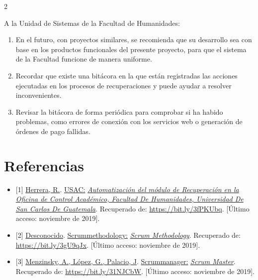 \documentclass[12pt,spanish,Letterpaper,openany]{book}
\providecommand{\tightlist}{%
  \setlength{\itemsep}{0pt}\setlength{\parskip}{0pt}}
\newcommand{\spaceoneminus}{\vspace{-1mm}}
\newcommand{\spacetwominus}{\vspace{-2mm}}
\newcommand{\spacefourminus}{\vspace{-4mm}}
\begin{document}
\begin {multicols}{2}
\spacetwominus
\spaceoneminus

A la Unidad de Sistemas de la Facultad de Humanidades:

\begin{enumerate}
\def\labelenumi{\arabic{enumi}.}
\item
  En el futuro, con proyectos similares, se recomienda que su desarrollo sea con base en los productos funcionales del presente proyecto, para que el sistema de la Facultad funcione de manera uniforme.
\item
  Recordar que existe una bitácora en la que están registradas las acciones ejecutadas en los procesos de recuperaciones y puede ayudar a resolver inconvenientes.
\item
  Revisar la bitácora de forma periódica para comprobar si ha habido problemas, como errores de conexión con los servicios web o generación de órdenes de pago fallidas.
\end{enumerate}

\spacefourminus

\hypertarget{referencias-2}{%
\section{Referencias}\label{referencias-2}}

\spacetwominus
\spaceoneminus

\begin{itemize}
\item
  {[}1{]} \href{http://www.repositorio.usac.edu.gt/8239/1/Rodrigo\%20Antonio\%20Herrera\%20De\%20Le\%C3\%B3n.pdf}{Herrera, R.}. \href{https://repositorio.usac.edu.gt}{USAC:} \href{http://www.repositorio.usac.edu.gt/8239/1/Rodrigo\%20Antonio\%20Herrera\%20De\%20Le\%C3\%B3n.pdf}{\emph{Automatización del módulo de Recuperación en la Oficina de Control Académico, Facultad De Humanidades, Universidad De San Carlos De Guatemala}}. Recuperado de: \url{https://bit.ly/3fPKUbq}. {[}Último acceso: noviembre de 2019{]}.
  \spaceoneminus
\item
  {[}2{]} \href{http://scrummethodology.com/}{Desconocido}. \href{http://scrummethodology.com/}{Scrummethodology:} \href{http://scrummethodology.com/}{\emph{Scrum Methodology}}. Recuperado de: \url{https://bit.ly/3gU9qJx}. {[}Último acceso: noviembre de 2019{]}.
\end{itemize}

\spaceoneminus

\begin{itemize}
\tightlist
\item
  {[}3{]} \href{https://www.scrummanager.net/files/scrum_manager.pdf1}{Menzinsky, A., López, G., Palacio, J}. \href{scrummanager.net}{Scrummanager:} \href{https://www.scrummanager.net/files/scrum_manager.pdf1}{\emph{Scrum Master}}. Recuperado de: \url{https://bit.ly/31NJCbW}. {[}Último acceso: noviembre de 2019{]}.
\end{itemize}


\end{multicols}
\end{document}
